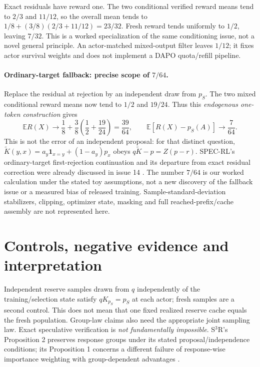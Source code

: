 \documentclass[10pt]{article}
\newcommand{\EE}{\mathbb E}
\begin{document}
Exact residuals have reward one. The two conditional verified reward means tend to $2/3$ and $11/12$, so the overall mean tends to $1/8+(3/8)(2/3+11/12)=23/32$. Fresh reward tends uniformly to $1/2$, leaving $7/32$. This is a worked specialization of the same conditioning issue, not a novel general principle. An actor-matched mixed-output filter leaves $1/12$; it fixes actor survival weights and does not implement a DAPO quota/refill pipeline.

\paragraph{Ordinary-target fallback: precise scope of $7/64$.}
Replace the residual at rejection by an independent draw from $p_S$. The two mixed conditional reward means now tend to $1/2$ and $19/24$. Thus this \emph{endogenous one-token construction} gives
\[
 \EE R(X)\to\frac18+\frac38\left(\frac12+\frac{19}{24}\right)=\frac{39}{64},
 \qquad \EE[R(X)-p_S(A)]\to\frac7{64}.
\]
This is not the error of an independent proposal: for that distinct question, $\widetilde K(y,x)=a_y\mathbf1_{x=y}+(1-a_y)p_x$ obeys $q\widetilde K-p=Z(p-r)$. SPEC-RL's ordinary-target first-rejection continuation and its departure from exact residual correction were already discussed in issue 14 \citep{liu2026specrl,specrlissue2025}. The number $7/64$ is our worked calculation under the stated toy assumptions, not a new discovery of the fallback issue or a measured bias of released training. Sample-standard-deviation stabilizers, clipping, optimizer state, masking and full reached-prefix/cache assembly are not represented here.

\section{Controls, negative evidence and interpretation}
Independent reserve samples drawn from $q$ independently of the training/selection state satisfy $qK_{p_S}=p_S$ at each actor; fresh samples are a second control. This does not mean that one fixed realized reserve cache equals the fresh population. Group-law claims also need the appropriate joint sampling law. Exact speculative verification is \emph{not fundamentally impossible}. S$^3$R's Proposition 2 preserves response groups under its stated proposal/independence conditions; its Proposition 1 concerns a different failure of response-wise importance weighting with group-dependent advantages \citep{he2026s3r}.
\end{document}
